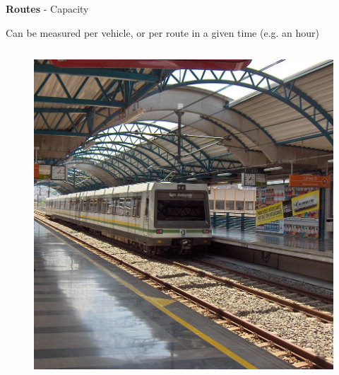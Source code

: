\documentclass[aspectratio=169]{beamer}
\begin{document}
\begin{frame}
	
	\textbf{Routes} - Capacity
	
	\vspace{2mm}
	
	Can be measured per vehicle, or per route in a given time (e.g. an hour)
	
	\begin{columns}
		\begin{column}{0.5\textwidth}
			
			\begin{figure}
				\centering
				\includegraphics[width=0.9\linewidth]{images/metro_medellin.png}
			\end{figure}
			
			
		\end{column}
		

\end{columns}
\end{frame}
\end{document}
